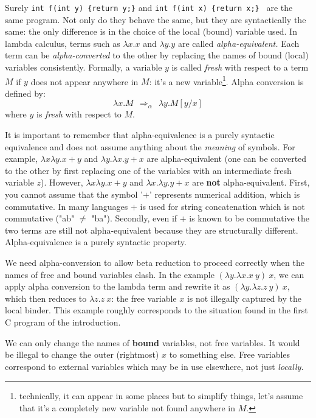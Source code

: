 Surely \verb+int f(int y) {return y;}+ and 
\verb+int f(int x) {return x;}+  \ are the same program.  Not only do they behave
the same, but they are syntactically the same: the only difference is in the
choice of the local (bound) variable used.  In lambda calculus, terms such as
$\lambda x.x$ and $\lambda y.y$ are called {\em alpha-equivalent.\/}  Each
term can be {\em alpha-converted\/} to the other by replacing the names of
bound (local) variables consistently.  Formally, a variable $y$ is called
{\em fresh\/} with respect to a term $M$ if $y$ does not appear anywhere in $M$:
it's a new variable\footnote{technically, it can appear in some places but to
  simplify things, let's assume that it's a completely new variable not found anywhere
  in $M$.}.  Alpha conversion is defined by:
$$\lambda x.M  ~~\Rightarrow_\alpha~~ \lambda y.M[y/x] $$
where $y$ is {\em fresh\/} with respect to $M$.

It is important to remember that alpha-equivalence is a purely
syntactic equivalence and does not assume anything about the {\em
  meaning\/} of symbols.  For example, $\lambda x\lambda y.x+y$ and
$\lambda y.\lambda x.y+x$ are alpha-equivalent (one can be converted
to the other by first replacing one of the variables with an
intermediate fresh variable $z$).  However, $\lambda x\lambda y.x+y$
and $\lambda x.\lambda y.y+x$ are {\bf not} alpha-equivalent.  First,
you cannot assume that the symbol '$+$' represents numerical
addition, which is commutative.  In many languages $+$ is used for
string concatenation which is not commutative ("ab" $\not=$ "ba").  Secondly, even
if $+$ is known to be commutative the two terms are still not
alpha-equivalent because they are structurally different.  Alpha-equivalence
is a purely syntactic property.

We need alpha-conversion to allow beta reduction to proceed correctly when
the names of free and bound variables clash.  In the example
$(\lambda y.\lambda x.x~y)~ x$, we can apply alpha conversion to the lambda
term and rewrite it as $(\lambda y.\lambda z.z~y)~ x$, which then reduces
to $\lambda z.z~x$: the free variable $x$ is not illegally captured by the
local binder.  This example roughly corresponds to the situation found in
the first C program of the introduction.

We can only change the names of {\bf bound\/} variables,
not free variables.  It would be illegal to change the outer (rightmost) $x$ to
something else.  Free variables correspond to external variables which may
be in use elsewhere, not just {\em locally.\/}


